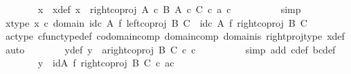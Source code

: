 \begin{isabellebody}
\ \ \ \ \ \ \isamarkupfalse%
\ x\ \ x{\isacharunderscore}{\kern0pt}def{\isacharcolon}{\kern0pt}\ {\isachardoublequoteopen}x\ {\isacharequal}{\kern0pt}\ right{\isacharunderscore}{\kern0pt}coproj\ {\isacharparenleft}{\kern0pt}A\ {\isasymtimes}\isactrlsub c\ B{\isacharparenright}{\kern0pt}\ {\isacharparenleft}{\kern0pt}A\ {\isasymtimes}\isactrlsub c\ C{\isacharparenright}{\kern0pt}\ {\isasymcirc}\isactrlsub c\ {\isasymlangle}a{\isacharcomma}{\kern0pt}\ c{\isasymrangle}{\isachardoublequoteclose}\isanewline
\ \ \ \ \ \ \ \ \isamarkupfalse%
\ simp\isanewline
\ \ \ \ \ \ \isamarkupfalse%
\ x{\isacharunderscore}{\kern0pt}type{\isacharcolon}{\kern0pt}\ {\isachardoublequoteopen}x\ {\isasymin}\isactrlsub c\ domain\ {\isacharparenleft}{\kern0pt}{\isacharparenleft}{\kern0pt}id\isactrlsub c\ A\ {\isasymtimes}\isactrlsub f\ left{\isacharunderscore}{\kern0pt}coproj\ B\ C{\isacharparenright}{\kern0pt}\ {\isasymamalg}\ {\isacharparenleft}{\kern0pt}id\isactrlsub c\ A\ {\isasymtimes}\isactrlsub f\ right{\isacharunderscore}{\kern0pt}coproj\ B\ C{\isacharparenright}{\kern0pt}{\isacharparenright}{\kern0pt}{\isachardoublequoteclose}\isanewline
\ \ \ \ \ \ \ \ \isamarkupfalse%
\ ac{\isacharunderscore}{\kern0pt}type\ cfunc{\isacharunderscore}{\kern0pt}type{\isacharunderscore}{\kern0pt}def\ codomain{\isacharunderscore}{\kern0pt}comp\ domain{\isacharunderscore}{\kern0pt}comp\ domain{\isacharunderscore}{\kern0pt}is\ right{\isacharunderscore}{\kern0pt}proj{\isacharunderscore}{\kern0pt}type\ x{\isacharunderscore}{\kern0pt}def\ \isamarkupfalse%
\ auto\isanewline
\ \ \ \ \ \ \isamarkupfalse%
\ y{\isacharunderscore}{\kern0pt}def{}{\isacharcolon}{\kern0pt}\ {\isachardoublequoteopen}y\ {\isacharequal}{\kern0pt}\ {\isasymlangle}a{\isacharcomma}{\kern0pt}right{\isacharunderscore}{\kern0pt}coproj\ B\ C\ {\isasymcirc}\isactrlsub c\ c{\isasymrangle}{\isachardoublequoteclose}\isanewline
\ \ \ \ \ \ \ \ \isamarkupfalse%
\ {\isacharparenleft}{\kern0pt}simp\ add{\isacharcolon}{\kern0pt}\ c{\isacharunderscore}{\kern0pt}def\ bc{\isacharunderscore}{\kern0pt}def{\isacharparenright}{\kern0pt}\isanewline
\ \ \ \ \ \ \isamarkupfalse%
\ {\isachardoublequoteopen}y\ {\isacharequal}{\kern0pt}\ {\isacharparenleft}{\kern0pt}id{\isacharparenleft}{\kern0pt}A{\isacharparenright}{\kern0pt}\ {\isasymtimes}\isactrlsub f\ right{\isacharunderscore}{\kern0pt}coproj\ B\ C{\isacharparenright}{\kern0pt}\ {\isasymcirc}\isactrlsub c\ {\isasymlangle}a{\isacharcomma}{\kern0pt}c{\isasymrangle}{\isachardoublequoteclose}\isanewline

\end{isabellebody}
